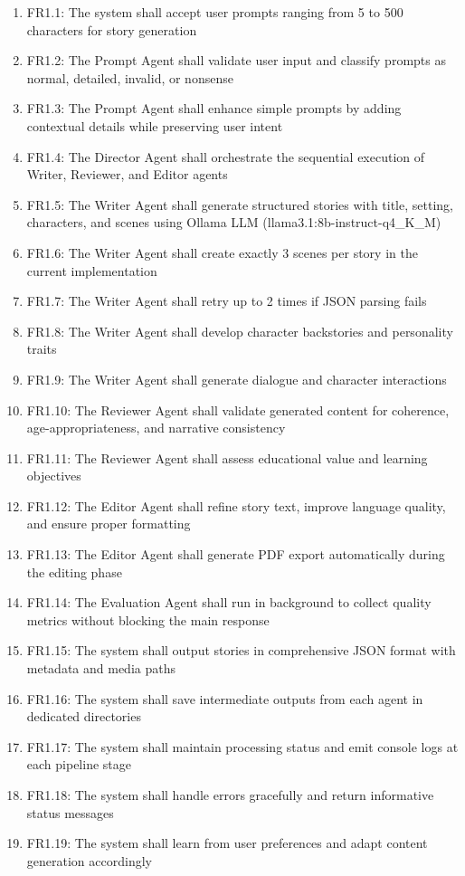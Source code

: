 \begin{enumerate}
    \item FR1.1: The system shall accept user prompts ranging from 5 to 500 characters for story generation
    \item FR1.2: The Prompt Agent shall validate user input and classify prompts as normal, detailed, invalid, or nonsense
    \item FR1.3: The Prompt Agent shall enhance simple prompts by adding contextual details while preserving user intent
    \item FR1.4: The Director Agent shall orchestrate the sequential execution of Writer, Reviewer, and Editor agents
    \item FR1.5: The Writer Agent shall generate structured stories with title, setting, characters, and scenes using Ollama LLM (llama3.1:8b-instruct-q4\_K\_M)
    \item FR1.6: The Writer Agent shall create exactly 3 scenes per story in the current implementation
    \item FR1.7: The Writer Agent shall retry up to 2 times if JSON parsing fails
    \item FR1.8: The Writer Agent shall develop character backstories and personality traits
    \item FR1.9: The Writer Agent shall generate dialogue and character interactions
    \item FR1.10: The Reviewer Agent shall validate generated content for coherence, age-appropriateness, and narrative consistency
    \item FR1.11: The Reviewer Agent shall assess educational value and learning objectives
    \item FR1.12: The Editor Agent shall refine story text, improve language quality, and ensure proper formatting
    \item FR1.13: The Editor Agent shall generate PDF export automatically during the editing phase
    \item FR1.14: The Evaluation Agent shall run in background to collect quality metrics without blocking the main response
    \item FR1.15: The system shall output stories in comprehensive JSON format with metadata and media paths
    \item FR1.16: The system shall save intermediate outputs from each agent in dedicated directories
    \item FR1.17: The system shall maintain processing status and emit console logs at each pipeline stage
    \item FR1.18: The system shall handle errors gracefully and return informative status messages
    \item FR1.19: The system shall learn from user preferences and adapt content generation accordingly
\end{enumerate}

